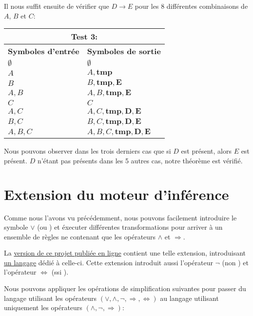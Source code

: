 \documentclass[12pt]{article}
\begin{document}
Il nous suffit ensuite de vérifier que $D \rightarrow E$ pour les 8 différentes combinaisons de $A$, $B$ et $C$:

\begin{tabular}{|p{4cm}|p{6.5cm}|}
  \hline
  \multicolumn{2}{|c|}{\textbf{Test 3:}} \\
  \hline
  \textbf{Symboles d'entrée} & \textbf{Symboles de sortie} \\
  \hline
  $\emptyset$ & $\emptyset$ \\
  \hline
  $A$ & $A, \mathbf{tmp}$ \\
  \hline
  $B$ & $B, \mathbf{tmp}, \mathbf{E}$ \\
  \hline
  $A, B$ & $A, B, \mathbf{tmp}, \mathbf{E}$ \\
  \hline
  $C$ & $C$ \\
  \hline
  $A, C$ & $A, C, \mathbf{tmp}, \mathbf{D}, \mathbf{E}$ \\
  \hline
  $B, C$ & $B, C, \mathbf{tmp}, \mathbf{D}, \mathbf{E}$ \\
  \hline
  $A, B, C$ & $A, B, C, \mathbf{tmp}, \mathbf{D}, \mathbf{E}$ \\
  \hline
\end{tabular}

Nous pouvons observer dans les trois derniers cas que si $D$ est présent, alors $E$ est présent.
$D$ n'étant pas présents dans les 5 autres cas, notre théorème est vérifié.

\section{Extension du moteur d'inférence}

Comme nous l'avons vu précédemment, nous pouvons facilement introduire le symbole $\lor$ (\og ou \fg) et éxecuter différentes transformations pour arriver à un ensemble de règles ne contenant que les opérateurs $\land$ et $\Rightarrow$.

La \href{https://github.com/adri326/lo21-project}{version de ce projet publiée en ligne} contient une telle extension, introduisant \href{https://github.com/adri326/lo21-project/blob/ext/ext/grammar.ebnf}{un langage} dédié à celle-ci.
Cette extension introduit aussi l'opérateur $\neg$ (\og non \fg) et l'opérateur $\Leftrightarrow$ (\og ssi \fg).

Nous pouvons appliquer les opérations de simplification suivantes pour passer du langage utilisant les opérateurs \((\lor, \land, \neg, \Rightarrow, \Leftrightarrow)\) au langage utilisant uniquement les opérateurs \((\land, \neg, \Rightarrow)\):
\end{document}
